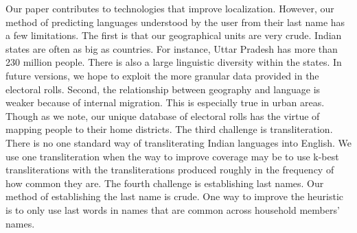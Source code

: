 \documentclass[11pt,  letterpaper]{article}
\begin{document}
Our paper contributes to technologies that improve localization. However, our method of predicting languages understood by the user from their last name has a few limitations. The first is that our geographical units are very crude. Indian states are often as big as countries. For instance, Uttar Pradesh has more than 230 million people. There is also a large linguistic diversity within the states. In future versions, we hope to exploit the more granular data provided in the electoral rolls. Second, the relationship between geography and language is weaker because of internal migration. This is especially true in urban areas. Though as we note, our unique database of electoral rolls has the virtue of mapping people to their home districts. The third challenge is transliteration. There is no one standard way of transliterating Indian languages into English. We use one transliteration when the way to improve coverage may be to use k-best transliterations with the transliterations produced roughly in the frequency of how common they are. The fourth challenge is establishing last names. Our method of establishing the last name is crude. One way to improve the heuristic is to only use last words in names that are common across household members’ names. 

\newpage


\end{document}
